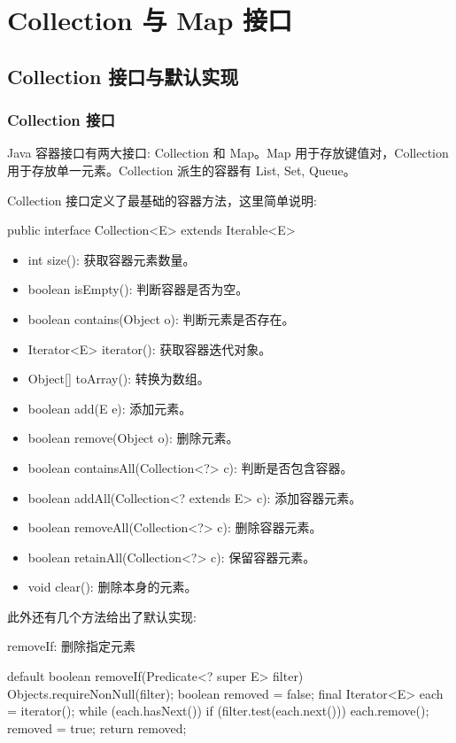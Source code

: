 \section{Collection 与 Map 接口}

\subsection{Collection 接口与默认实现}

\subsubsection{Collection 接口}

Java 容器接口有两大接口: Collection 和 Map。Map 用于存放键值对，Collection 用于存放单一元素。Collection 派生的容器有 List, Set, Queue。

Collection 接口定义了最基础的容器方法，这里简单说明:

\begin{Java}
public interface Collection<E> extends Iterable<E>
\end{Java}

\begin{itemize}
    \item int size(): 获取容器元素数量。
    \item boolean isEmpty(): 判断容器是否为空。
    \item boolean contains(Object o): 判断元素是否存在。
    \item Iterator<E> iterator(): 获取容器迭代对象。
    \item Object[] toArray(): 转换为数组。
    \item boolean add(E e): 添加元素。
    \item boolean remove(Object o): 删除元素。
    \item boolean containsAll(Collection<?> c): 判断是否包含容器。
    \item boolean addAll(Collection<? extends E> c): 添加容器元素。
    \item boolean removeAll(Collection<?> c): 删除容器元素。
    \item boolean retainAll(Collection<?> c): 保留容器元素。
    \item void clear(): 删除本身的元素。
\end{itemize}

此外还有几个方法给出了默认实现:

removeIf: 删除指定元素

\begin{Java}
default boolean removeIf(Predicate<? super E> filter) {
    Objects.requireNonNull(filter);
    boolean removed = false;
    final Iterator<E> each = iterator();
    while (each.hasNext()) {
        if (filter.test(each.next())) {
            each.remove();
            removed = true;
        }
    }
    return removed;
}
\end{Java}

